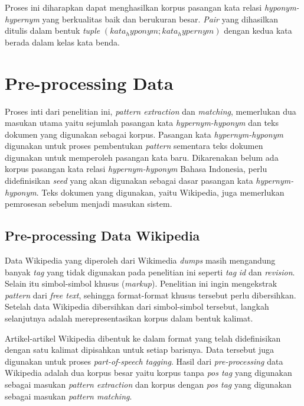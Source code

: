 Proses ini diharapkan dapat menghasilkan korpus pasangan kata relasi \textit{hyponym-hypernym} yang berkualitas baik dan berukuran besar. \textit{Pair} yang dihasilkan ditulis dalam bentuk \textit{tuple} $(kata_hyponym;kata_hypernym)$ dengan kedua kata berada dalam kelas kata benda.


\section{Pre-processing Data}
Proses inti dari penelitian ini, \textit{pattern extraction} dan \textit{matching}, memerlukan dua masukan utama yaitu sejumlah pasangan kata \textit{hypernym-hyponym} dan teks dokumen yang digunakan sebagai korpus. Pasangan kata \textit{hypernym-hyponym} digunakan untuk proses pembentukan \textit{pattern} sementara teks dokumen digunakan untuk memperoleh pasangan kata baru. Dikarenakan belum ada korpus pasangan kata relasi \textit{hypernym-hyponym} Bahasa Indonesia, perlu didefinisikan \textit{seed} yang akan digunakan sebagai dasar pasangan kata \textit{hypernym-hyponym}. Teks dokumen yang digunakan, yaitu Wikipedia, juga memerlukan pemrosesan sebelum menjadi masukan sistem.

\subsection{Pre-processing Data Wikipedia}
Data Wikipedia yang diperoleh dari Wikimedia \textit{dumps} masih mengandung banyak \textit{tag} yang tidak digunakan pada penelitian ini seperti \textit{tag} \textit{id} dan \textit{revision}. Selain itu simbol-simbol khusus (\textit{markup}). Penelitian ini ingin mengekstrak \textit{pattern} dari \textit{free text}, sehingga format-format khusus tersebut perlu dibersihkan. Setelah data Wikipedia dibersihkan dari simbol-simbol tersebut, langkah selanjutnya adalah merepresentasikan korpus dalam bentuk kalimat. 

Artikel-artikel Wikipedia dibentuk ke dalam format yang telah didefinisikan dengan satu kalimat dipisahkan untuk setiap barisnya. Data tersebut juga digunakan untuk proses \textit{part-of-speech tagging}. Hasil dari \textit{pre-processing} data Wikipedia adalah dua korpus besar yaitu korpus tanpa \textit{pos tag} yang digunakan sebagai masukan \textit{pattern extraction} dan korpus dengan \textit{pos tag} yang digunakan sebagai masukan \textit{pattern matching}. 

